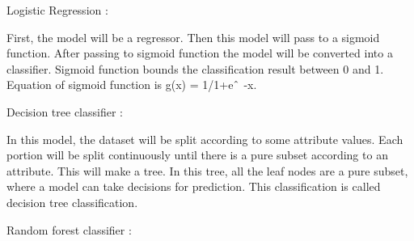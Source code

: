 \documentclass[12pt]{article}
\begin{document}
\vspace{\baselineskip}
\begin{justify}
{\fontsize{14pt}{16.8pt}\selectfont Logistic Regression :\par}
\end{justify}\par

\begin{justify}
{\fontsize{14pt}{16.8pt}\selectfont  First, the model will be a regressor. Then this model will pass to a sigmoid function. After passing to sigmoid function the model will be converted into a classifier. Sigmoid function bounds the classification result between 0 and 1. Equation of sigmoid function is g(x) = 1/1+e$ \string^ $ -x.\par}
\end{justify}\par


\vspace{\baselineskip}

\vspace{\baselineskip}

\vspace{\baselineskip}
\begin{justify}
{\fontsize{14pt}{16.8pt}\selectfont Decision tree classifier :\par}
\end{justify}\par

\begin{justify}
{\fontsize{14pt}{16.8pt}\selectfont  In this model, the dataset will be split according to some attribute values. Each portion will be split continuously until there is a pure subset according to an attribute. This will make a tree. In this tree, all the leaf nodes are a pure subset, where a model can take decisions for prediction. This classification is called decision tree classification.\par}
\end{justify}\par


\vspace{\baselineskip}

\vspace{\baselineskip}
\begin{justify}
{\fontsize{14pt}{16.8pt}\selectfont Random forest classifier :\par}
\end{justify}\par
\end{document}
